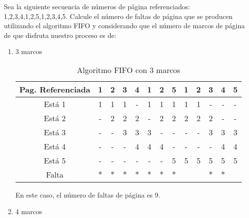 \begin{ejercicio}
Sea la siguiente secuencia de números de página referenciados: 1,2,3,4,1,2,5,1,2,3,4,5. Calcule el número de faltas de página que se producen utilizando el algoritmo FIFO y considerando que el número de marcos de página de que disfruta nuestro proceso es de:
\begin{enumerate}
    \item 3 marcos
    
    \begin{table}[H]
        \centering
        \begin{tabular}{|c||c|c|c|c|c|c|c|c|c|c|c|c|}
            \hline
            Pag. Referenciada & 1 & 2 & 3 & 4 & 1 & 2 & 5 & 1 & 2 & 3 & 4 & 5 \\ \hline \hline
            Está 1            & 1 & 1 & 1 & - & 1 & 1 & 1 & 1 & 1 & - & - & - \\ \hline
            Está 2            & - & 2 & 2 & 2 & - & 2 & 2 & 2 & 2 & 2 & - & - \\ \hline
            Está 3            & - & - & 3 & 3 & 3 & - & - & - & - & 3 & 3 & 3 \\ \hline
            Está 4            & - & - & - & 4 & 4 & 4 & - & - & - & - & 4 & 4 \\ \hline
            Está 5            & - & - & - & - & - & - & 5 & 5 & 5 & 5 & 5 & 5 \\ \hline
            Falta             & $\ast$ & $\ast$ & $\ast$ & $\ast$ & $\ast$ & $\ast$ & $\ast$ &   &   & $\ast$ & $\ast$ &  \\ \hline
        \end{tabular}
        \caption{Algoritmo FIFO con 3 marcos}
    \end{table}
    En este caso, el número de faltas de página es 9.


    \item 4 marcos
    

\end{enumerate}
\end{ejercicio}
